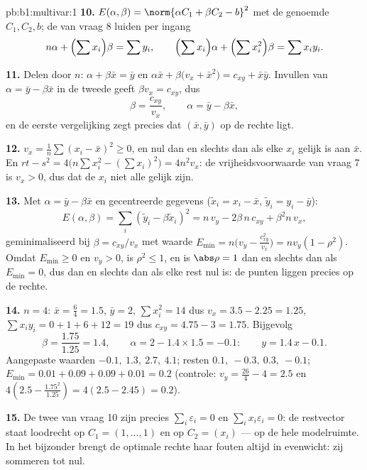 \begin{solution}{pb:b1:multivar:1}
\textbf{10.} $E(\alpha, \beta) = \norm{\alpha C_1 + \beta C_2 -
b}^2$ met de genoemde $C_1, C_2, b$; de  van
vraag 8 luiden per ingang
\[
n\alpha + \Bigl(\sum x_i\Bigr)\beta = \sum y_i,
\qquad
\Bigl(\sum x_i\Bigr)\alpha + \Bigl(\sum x_i^2\Bigr)\beta = \sum
x_i y_i .
\]

\textbf{11.} Delen door $n$: $\alpha + \beta\bar x = \bar y$ en
$\alpha\bar x + \beta\bigl(v_x + \bar x^2\bigr) = c_{xy} + \bar
x\bar y$. Invullen van $\alpha = \bar y - \beta\bar x$ in de tweede
geeft $\beta v_x = c_{xy}$, dus
\[
\beta = \frac{c_{xy}}{v_x}, \qquad \alpha = \bar y - \beta\bar x ,
\]
en de eerste vergelijking zegt precies dat $(\bar x, \bar y)$ op de
rechte ligt.

\textbf{12.} $v_x = \frac1n\sum(x_i - \bar x)^2 \geq 0$, en nul dan
en slechts dan als elke $x_i$ gelijk is aan $\bar x$. En $rt - s^2
= 4\bigl(n\sum x_i^2 - (\sum x_i)^2\bigr) = 4n^2 v_x$: de
vrijheidsvoorwaarde van vraag 7 is $v_x > 0$, dus dat de $x_i$ niet
alle gelijk zijn.

\textbf{13.} Met $\alpha = \bar y - \beta\bar x$ en gecentreerde
gegevens ($\tilde x_i = x_i - \bar x$, $\tilde y_i = y_i - \bar y$):
\[
E(\alpha, \beta) = \sum_i(\tilde y_i - \beta\tilde x_i)^2
= n\,v_y - 2\beta\,n\,c_{xy} + \beta^2 n\,v_x ,
\]
geminimaliseerd bij $\beta = c_{xy}/v_x$ met waarde $E_{\min} =
n\bigl(v_y - \frac{c_{xy}^2}{v_x}\bigr) = n v_y(1 - \rho^2)$. Omdat
$E_{\min} \geq 0$ en $v_y > 0$, is $\rho^2 \leq 1$, en is $\abs\rho
= 1$ dan en slechts dan als $E_{\min} = 0$, dus dan en slechts dan
als elke rest nul is: de punten liggen precies op de rechte.

\textbf{14.} $n = 4$: $\bar x = \frac64 = 1.5$, $\bar y = 2$, $\sum
x_i^2 = 14$ dus $v_x = 3.5 - 2.25 = 1.25$, $\sum x_iy_i = 0 + 1 + 6
+ 12 = 19$ dus $c_{xy} = 4.75 - 3 = 1.75$. Bijgevolg
\[
\beta = \frac{1.75}{1.25} = 1.4,
\qquad
\alpha = 2 - 1.4\times1.5 = -0.1 :
\qquad y = 1.4\,x - 0.1 .
\]
Aangepaste waarden $-0.1,\ 1.3,\ 2.7,\ 4.1$; resten $0.1,\ -0.3,\
0.3,\ -0.1$; $E_{\min} = 0.01 + 0.09 + 0.09 + 0.01 = 0.2$
(controle: $v_y = \frac{26}4 - 4 = 2.5$ en $4(2.5 -
\frac{1.75^2}{1.25}) = 4(2.5 - 2.45) = 0.2$).

\textbf{15.} De twee  van vraag 10 zijn
precies $\sum_i\varepsilon_i = 0$ en $\sum_i x_i\varepsilon_i = 0$:
de restvector staat loodrecht op $C_1 = (1, \dots, 1)$ en op $C_2 =
(x_i)$ --- op de hele modelruimte. In het bijzonder brengt de
optimale rechte haar fouten altijd in evenwicht: zij sommeren tot
nul.


\end{solution}
